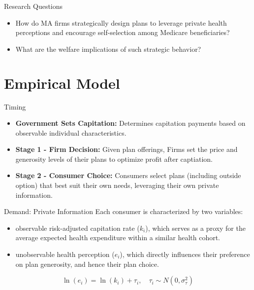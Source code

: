 \documentclass[professionalfonts, aspectratio=169]{beamer}
\begin{document}
\begin{frame}{Research Questions}
  \begin{itemize}
    \item How do MA firms strategically design plans to leverage private health perceptions and encourage self-selection among Medicare beneficiaries?
    \item What are the welfare implications of such strategic behavior?
  \end{itemize}
  
\end{frame}


\section{Empirical Model}

\begin{frame}{Timing}
  \begin{itemize}
    \item \textbf{Government Sets Capitation:} Determines capitation payments based on observable individual characteristics.
    \item \textbf{Stage 1 - Firm Decision:} Given plan offerings, Firms set the price and generosity levels of their plans to optimize profit after captiation.
    \item \textbf{Stage 2 - Consumer Choice:} Consumers select plans (including outside option) that best suit their own needs, leveraging their own private information.
  \end{itemize}
\end{frame}

\begin{frame}{Demand: Private Information}
  Each consumer is characterized by two variables:
  \begin{itemize}
      \item observable risk-adjusted capitation rate ($k_i$), which serves as a proxy for the average expected health expenditure within a similar health cohort.
      \item unobservable health perception ($e_i$), which directly influences their preference on plan generosity, and hence their plan choice.
  \end{itemize}

  \begin{equation}
    \ln(e_i) = \ln(k_i) + \tau_i, \quad \tau_i \sim N(0, \sigma_\tau^2)
  \end{equation}

\end{frame}
\end{document}
